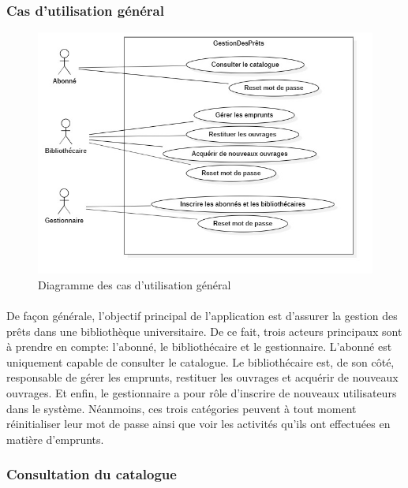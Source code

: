 \subsubsection{Cas d'utilisation général} 
\begin{figure}[h]
        \centering
        \includegraphics[width=1\textwidth]{generalUseCase}
        \caption{Diagramme des cas d'utilisation général}
        \label{image-generalUseCase}
        \end{figure}
\paragraph{}
De façon générale, l'objectif principal de l'application est d'assurer la 
gestion des prêts dans une bibliothèque universitaire. De ce fait, trois 
acteurs principaux sont à prendre en compte: l'abonné, le bibliothécaire et 
le gestionnaire. L'abonné est uniquement capable de consulter le catalogue.
Le bibliothécaire est, de son côté, responsable de gérer les emprunts, restituer 
les ouvrages et acquérir de nouveaux ouvrages. Et enfin, le gestionnaire a pour rôle 
d'inscrire de nouveaux utilisateurs dans le système. Néanmoins, ces trois 
catégories peuvent à tout moment réinitialiser leur mot de passe ainsi 
que voir les activités qu'ils ont effectuées en matière d'emprunts.

\subsubsection{Consultation du catalogue} 
